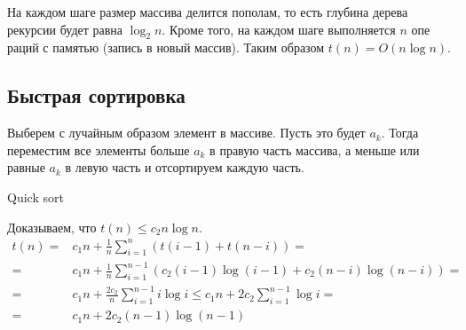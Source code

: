     \begin{time}
        На каждом шаге размер массива делится пополам, то есть глубина дерева рекурсии будет равна $\log_2n$. Кроме того, на каждом шаге выполняется $n$ опе
        раций с памятью (запись в новый массив). Таким образом $t(n) = O(n \log n)$.
    \end{time}

\subsection{Быстрая сортировка}
    Выберем с
    лучайным образом элемент в массиве. Пусть это будет $a_k$. Тогда переместим все элементы больше $a_k$ в правую часть массива, а меньше или равные $a_k$ в левую часть и отсортируем каждую часть. 

    \begin{algorithm}
        \caption{Quick sort}
        \begin{algorithmic}
                    \EndWhile
                    \EndWhile
                \EndWhile
                \State {}
                \State {} 
            \EndFunction
        \end{algorithmic}
    \end{algorithm}

    \begin{time}
        Доказываем, что $t(n) \leq c_2 n \log n$.
        \begin{align*}
            t(n) = & c_1 n + \frac{1}{n}\sum_{i = 1}^{n}(t(i-1) + t(n-i)) = \\
                 = & c_1 n + \frac{1}{n}\sum_{i = 1}^{n-1}(c_2(i-1) \log (i - 1)    + c_2(n - i) \log(n - i)) = \\
                 = & c_1 n + \frac{2c_2}{n} \sum_{i = 1}^{n-1} i \log i \leq c_1 n + 2c_2 \sum_{i = 1}^{n - 1} \log i = \\
                 = & c_1 n + 2c_2 (n-1) \log (n-1)
        \end{align*}
    \end{time}